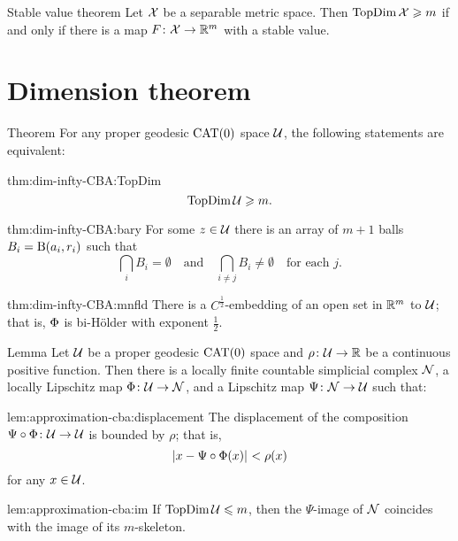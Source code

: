 \begin{thm}{Stable value theorem}\label{thm:stable-value}
Let $\mathcal{X}$ be a separable metric space.
Then $\mathop{\rm TopDim}\nolimits\mathcal{X}\geqslant m$ if and only if there is a map $F\colon\mathcal{X}\to\mathbb{R}^{m}$ with a stable value.
\end{thm}

\section{Dimension theorem}\label{sec:dim-CAT}

\begin{thm}{Theorem}\label{thm:dim-infty-CBA}
For any proper geodesic $\mathrm{CAT}(0)$ space $\mathcal{U}$, the following statements are equivalent:

\begin{subthm}{thm:dim-infty-CBA:TopDim}
\[\mathop{\rm TopDim}\nolimits \mathcal{U}\geqslant m.\]
\end{subthm}

\begin{subthm}{thm:dim-infty-CBA:bary} 
For some $z\in \mathcal{U}$ there is an array of $m+1$ balls $B_i\z=\oBall(a_i,r_i)$ 
such that 
\[\bigcap_i B_i=\emptyset
\quad\text{and}\quad
\bigcap_{i\ne j} B_i\ne \emptyset
\quad \text{for each $j$}.\]

\end{subthm}


\begin{subthm}{thm:dim-infty-CBA:mnfld} 
There is a $C^{\frac{1}{2}}$-embedding of an open set in $\mathbb{R}^m$ to $\mathcal{U}$;
that is, $\Phi$ is bi-Hölder with exponent $\tfrac{1}{2}$.
\end{subthm}

\end{thm}


\begin{thm}{Lemma}\label{lem:approximation-cba}
Let $\mathcal{U}$ be a proper geodesic $\mathrm{CAT}(0)$ space
and $\rho\:\spc{U}\z\to\RR$ be a continuous positive function.
Then there is a locally finite countable simplicial complex $\mathcal{N}$,
a locally Lipschitz map $\map\:\spc{U}\z\to \spc{N}$, 
and a Lipschitz map $\Psi\colon\mathcal{N}\to\mathcal{U}$ such that:

\begin{subthm}{lem:approximation-cba:displacement}
The displacement of the composition $\Psi\circ\Phi\colon\mathcal{U}\to\mathcal{U}$ is bounded by $\rho$;
that is,
\[\dist{x}{\Psi\circ\map(x)}{}<\rho(x)\] 
for any $x\in\mathcal{U}$.
\end{subthm}

\begin{subthm}{lem:approximation-cba:im}
If $\mathop{\rm TopDim}\nolimits\mathcal{U}\leqslant m$, 
then the $\Psi$-image of $\mathcal{N}$ 
coincides with the image of its $m$-skeleton.
\end{subthm}

\end{thm}

